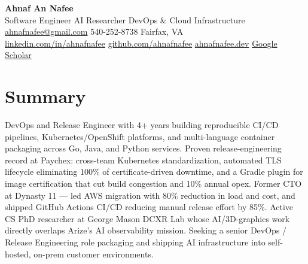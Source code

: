 \documentclass[letterpaper,10pt]{article}
\begin{document}
\begin{center}
  {\LARGE\bfseries\color{accent} Ahnaf An Nafee }\\[3pt]
  {\normalsize Software Engineer \textbar{} AI Researcher \textbar{} DevOps \& Cloud Infrastructure }\\[4pt]
  \small
  \href{mailto:ahnafnafee@gmail.com}{ahnafnafee@gmail.com} \textbar{}
  540-252-8738 \textbar{}
  Fairfax, VA\\
  \href{https://linkedin.com/in/ahnafnafee}{linkedin.com/in/ahnafnafee} \textbar{}
  \href{https://github.com/ahnafnafee}{github.com/ahnafnafee} \textbar{}
  \href{https://www.ahnafnafee.dev/}{ahnafnafee.dev} \textbar{} \href{https://scholar.google.com/citations?user=u15DO0cAAAAJ}{Google Scholar}
\end{center}

\section*{Summary}
DevOps and Release Engineer with 4+ years building reproducible CI/CD pipelines, Kubernetes/OpenShift platforms, and multi-language container packaging across Go, Java, and Python services. Proven release-engineering record at Paychex: cross-team Kubernetes standardization, automated TLS lifecycle eliminating 100\% of certificate-driven downtime, and a Gradle plugin for image certification that cut build congestion and 10\% annual opex. Former CTO at Dynasty 11 — led AWS migration with 80\% reduction in load and cost, and shipped GitHub Actions CI/CD reducing manual release effort by 85\%. Active CS PhD researcher at George Mason DCXR Lab whose AI/3D-graphics work directly overlaps Arize's AI observability mission. Seeking a senior DevOps / Release Engineering role packaging and shipping AI infrastructure into self-hosted, on-prem customer environments.

\end{document}
